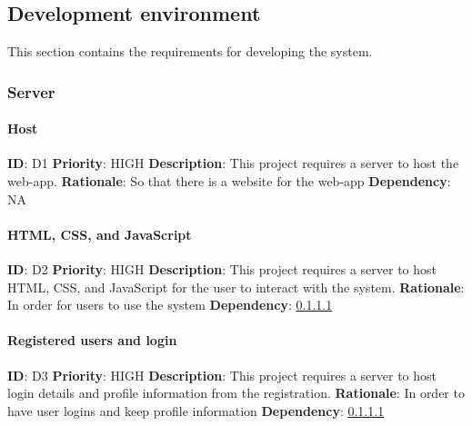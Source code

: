 \documentclass{article}
\begin{document}
\subsection{Development environment}
This section contains the requirements for developing the system.

\subsubsection{Server}

\paragraph{Host}\label{req:server}
\textbf{ID}: D1\newline
\textbf{Priority}: HIGH\newline
\textbf{Description}: This project requires a server to host the web-app.\newline
\textbf{Rationale}: So that there is a website for the web-app\newline
\textbf{Dependency}: NA

\paragraph{HTML, CSS, and JavaScript}\label{req:hostingLogin}
\textbf{ID}: D2\newline
\textbf{Priority}: HIGH\newline
\textbf{Description}: This project requires a server to host HTML, CSS, and JavaScript for the user to interact with the system.\newline
\textbf{Rationale}: In order for users to use the system\newline
\textbf{Dependency}: \ref{req:server}

\paragraph{Registered users and login}\label{req:hostingLogin}
\textbf{ID}: D3\newline
\textbf{Priority}: HIGH\newline
\textbf{Description}: This project requires a server to host login details and profile information from the registration.\newline
\textbf{Rationale}: In order to have user logins and keep profile information\newline
\textbf{Dependency}: \ref{req:server}
\end{document}
